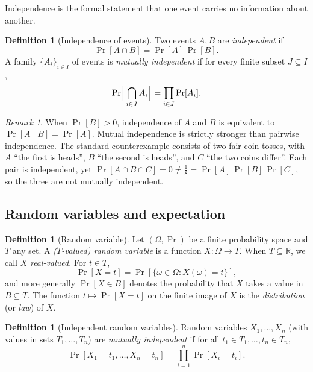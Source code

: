 \documentclass[11pt,a4paper]{article}
\theoremstyle{definition}
\newtheorem{definition}[theorem]{Definition}
\theoremstyle{remark}
\newtheorem{remark}[theorem]{Remark}
\newcommand{\R}{\ensuremath{\mathbb{R}}}
\begin{document}
Independence is the formal statement that one event carries no
information about another.

\begin{definition}[Independence of events]\label{probability:def-indep}
Two events \(A, B\) are \emph{independent} if
\[
\Pr[A \cap B] = \Pr[A]\,\Pr[B] .
\]
A family \(\{A_i\}_{i \in I}\) of events is \emph{mutually
independent} if for every finite subset \(J \subseteq I\),
\[
\Pr\Bigl[\,\bigcap_{i \in J} A_i\Bigr] = \prod_{i \in J} \Pr[A_i] .
\]
\end{definition}

\begin{remark}\label{probability:rem-indep}
When \(\Pr[B] > 0\), independence of \(A\) and \(B\) is equivalent to
\(\Pr[A \mid B] = \Pr[A]\). Mutual independence is strictly stronger than
pairwise independence. The standard counterexample consists of two
fair coin tosses, with \(A\) ``the first is heads'', \(B\) ``the
second is heads'', and \(C\) ``the two coins differ''. Each pair is
independent, yet \(\Pr[A \cap B \cap C] = 0 \neq \tfrac18 =
\Pr[A]\,\Pr[B]\,\Pr[C]\), so the three are not mutually independent.
\end{remark}

\subsection{Random variables and expectation}

\begin{definition}[Random variable]\label{probability:def-rv}
Let \((\Omega, \Pr)\) be a finite probability space and \(T\) any set.
A \emph{(\(T\)-valued) random variable} is a function
\(X\colon \Omega \to T\). When \(T \subseteq \R\), we call \(X\)
\emph{real-valued}. For \(t \in T\),
\[
\Pr[X = t] = \Pr[\{\omega \in \Omega : X(\omega) = t\}],
\]
and more generally \(\Pr[X \in B]\) denotes the probability that \(X\)
takes a value in \(B \subseteq T\). The function
\(t \mapsto \Pr[X = t]\) on the finite image of \(X\) is the
\emph{distribution} (or \emph{law}) of \(X\).
\end{definition}

\begin{definition}[Independent random variables]
\label{probability:def-indep-rv}
Random variables \(X_1, \dots, X_n\) (with values in sets
\(T_1, \dots, T_n\)) are \emph{mutually independent} if for all
\(t_1 \in T_1, \dots, t_n \in T_n\),
\[
\Pr[X_1 = t_1, \dots, X_n = t_n] = \prod_{i=1}^n \Pr[X_i = t_i] .
\]
\end{definition}
\end{document}
